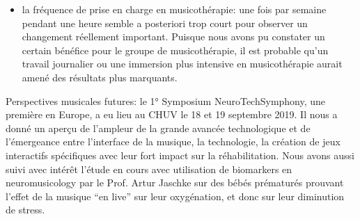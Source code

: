 \begin{itemize}
  \item la fréquence de prise en charge en musicothérapie:
  une fois par semaine pendant une heure semble a posteriori
  trop court pour observer un changement réellement important. Puisque nous avons pu
  constater un certain bénéfice pour le groupe de musicothérapie, il
  est probable qu'un travail journalier ou 
 une immersion plus intensive en
  musicothérapie aurait amené des résultats plus marquants.


\end{itemize}


 Perspectives musicales futures: le 1° Symposium
  NeuroTechSymphony, une première en Europe, a eu lieu au CHUV le 18 et 19 septembre 2019. Il  nous a
  donné un aperçu de l'ampleur de la grande avancée technologique
  et de l'émergeance entre  l'interface de la musique, la technologie, la
  création de jeux interactifs spécifiques avec leur fort impact sur la
  réhabilitation. Nous avons aussi suivi avec intérêt l'étude en cours avec utilisation de
  biomarkers en neuromusicology par le Prof. Artur Jaschke sur des
  bébés prématurés prouvant l'effet de la musique ``en live'' sur leur
  oxygénation, et donc sur leur diminution de stress.

